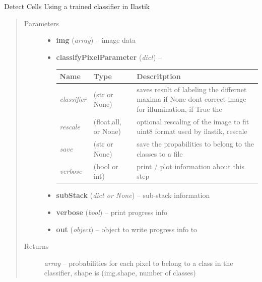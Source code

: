 \documentclass[letterpaper,10pt,english]{sphinxmanual}
\begin{document}
\begin{fulllineitems}
\label{api/ClearMap.ImageProcessing:ClearMap.ImageProcessing.IlastikClassification.classifyPixel}
Detect Cells Using a trained classifier in Ilastik
\begin{quote}\begin{description}
\item[{Parameters}] \leavevmode\begin{itemize}
\item {} 
\textbf{img} (\emph{array}) --
image data

\item {} 
\textbf{classifyPixelParameter} (\emph{dict}) --

\begin{tabulary}{\linewidth}{|L|L|L|}
\hline
\textsf{\relax 
Name
} & \textsf{\relax 
Type
} & \textsf{\relax 
Descritption
}\\
\hline
\emph{classifier}
 & 
(str or  None)
 & 
saves result of labeling the differnet maxima
if None dont correct image for illumination, if True the
\\
\hline
\emph{rescale}
 & 
(float,all, or None)
 & 
optional rescaling of the image to fit uint8 format
used by ilastik,  rescale
\\
\hline
\emph{save}
 & 
(str or None)
 & 
save the propabilities to belong to the classes to a file
\\
\hline
\emph{verbose}
 & 
(bool or int)
 & 
print / plot information about this step
\\
\hline\end{tabulary}


\item {} 
\textbf{subStack} (\emph{dict or None}) --
sub-stack information

\item {} 
\textbf{verbose} (\emph{bool}) --
print progress info

\item {} 
\textbf{out} (\emph{object}) --
object to write progress info to

\end{itemize}

\item[{Returns}] \leavevmode
\emph{array} --
probabilities for each pixel to belong to a class in the classifier, shape is (img.shape, number of classes)

\end{description}\end{quote}

\end{fulllineitems}
\end{document}
